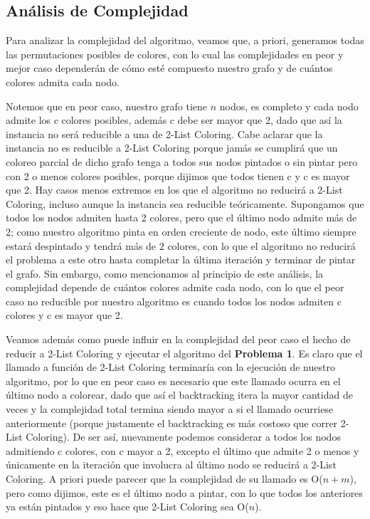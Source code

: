 \documentclass{article}
\theoremstyle{definition}
\theoremstyle{remark}
\begin{document}
\subsection{Análisis de Complejidad}

Para analizar la complejidad del algoritmo, veamos que, a priori, generamos todas las permutaciones posibles de colores, con lo cual las complejidades en peor y mejor caso dependerán de cómo esté compuesto nuestro grafo y de cuántos colores admita cada nodo.

Notemos que en peor caso, nuestro grafo tiene $n$ nodos, es completo y cada nodo admite los $c$ colores posibles, además $c$ debe ser mayor que 2, dado que así la instancia no será reducible a una de 2-List Coloring. Cabe aclarar que la instancia no es reducible a 2-List Coloring porque jamás se cumplirá que un coloreo parcial de dicho grafo tenga a todos sus nodos pintados o sin pintar pero con 2 o menos colores posibles, porque dijimos que todos tienen c y c es mayor que 2. Hay casos menos extremos en los que el algoritmo no reducirá a 2-List Coloring, incluso aunque la instancia sea reducible teóricamente. Supongamos que todos los nodos admiten hasta 2 colores, pero que el último nodo admite más de 2; como nuestro algoritmo pinta en orden creciente de nodo, este último siempre estará despintado y tendrá más de 2 colores, con lo que el algoritmo no reducirá el problema a este otro hasta completar la última iteración y terminar de pintar el grafo. Sin embargo, como mencionamos al principio de este análisis, la complejidad depende de cuántos colores admite cada nodo, con lo que el peor caso no reducible por nuestro algoritmo es cuando todos los nodos admiten c colores y c es mayor que 2.

Veamos además como puede influir en la complejidad del peor caso el hecho de reducir a 2-List Coloring y ejecutar el algoritmo del \textbf{Problema 1}. Es claro que el llamado a función de 2-List Coloring terminaría con la ejecución de nuestro algoritmo, por lo que en peor caso es necesario que este llamado ocurra en el último nodo a colorear, dado que así el backtracking itera la mayor cantidad de veces y la complejidad total termina siendo mayor a si el llamado ocurriese anteriormente (porque justamente el backtracking es más costoso que correr 2-List Coloring). De ser así, nuevamente podemos considerar a todos los nodos admitiendo c colores, con c mayor a 2, excepto el último que admite 2 o menos y únicamente en la iteración que involucra al último nodo se reducirá a 2-List Coloring. A priori puede parecer que la complejidad de su llamado es O($n+m$), pero como dijimos, este es el último nodo a pintar, con lo que todos los anteriores ya están pintados y eso hace que 2-List Coloring sea O($n$). 
\end{document}
